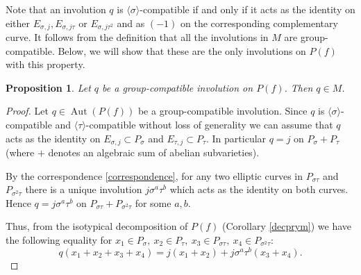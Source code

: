 \documentclass{amsart}
\newtheorem{prop}[thm]{Proposition}
\theoremstyle{remark}
\numberwithin{equation}{section}
\newcommand{\s}{\sigma}
\DeclareMathOperator{\Aut}{Aut}
\begin{document}
Note that an involution $q$ is $\langle \sigma \rangle$-compatible if and only if it acts as the identity on either $E_{\sigma,j}, E_{\sigma,j\tau}$ or $E_{\sigma,j\tau^2}$ and as $(-1)$ on the corresponding complementary curve.
It follows from the definition that all the involutions in $M$ are group-compatible. Below, we will show that these are the only involutions on $P(f)$ with this property.

\begin{prop}
\label{global}
    Let $q$ be a group-compatible involution on $P(f)$. Then $q \in M$.
\end{prop}
    
\begin{proof} 
    
    Let $q \in \Aut(P(f))$ be a group-compatible involution. 
    Since $q$ is $\langle \sigma \rangle$-compatible and $\langle \tau \rangle$-compatible without loss of generality we can assume  that $q$ acts as the identity on $E_{\sigma, j} \subset P_{\sigma}$ and $E_{\tau, j} \subset P_{\tau}$. In particular $q=j$ on $P_{\sigma}+P_{\tau}$ (where $+$ denotes an algebraic sum of abelian subvarieties).
    
           
   By the correspondence \ref{correspondence}, for any two elliptic curves in  $P_{\sigma\tau}$ and $P_{\sigma^2\tau}$ there is a unique involution $j\sigma^a\tau^b$ which acts as the identity on both curves. Hence $q=j\s^a\tau^b$ on $P_{\sigma\tau}+P_{\s^2\tau}$ for some $a,b$.
   
      Thus, from the isotypical decomposition of $P(f)$ (Corollary \ref{decprym}) we have the following equality for $x_1 \in P_{\sigma},\ x_2 \in P_{\tau},\ x_3 \in P_{\sigma\tau},\ x_4 \in P_{\sigma^2\tau}$: $$q(x_1 + x_2 + x_3 + x_4) = j(x_1 + x_2) + j\sigma^a\tau^b(x_3 + x_4).$$ 
      

\end{proof}
\end{document}
